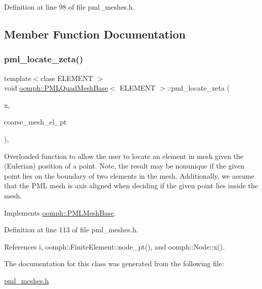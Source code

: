 Definition at line 98 of file pml\+\_\+meshes.\+h.



\subsection{Member Function Documentation}
\mbox{\label{classoomph_1_1PMLQuadMeshBase_a8054b13b65a898e1364ca30eace6c1e8}} 
\subsubsection{\texorpdfstring{pml\+\_\+locate\+\_\+zeta()}{pml\_locate\_zeta()}}
{\footnotesize\ttfamily template$<$class E\+L\+E\+M\+E\+NT $>$ \\
void \hyperlink{classoomph_1_1PMLQuadMeshBase}{oomph\+::\+P\+M\+L\+Quad\+Mesh\+Base}$<$ E\+L\+E\+M\+E\+NT $>$\+::pml\+\_\+locate\+\_\+zeta (\begin{DoxyParamCaption}\item[{const \hyperlink{classoomph_1_1Vector}{Vector}$<$ double $>$ \&}]{x,  }\item[{\hyperlink{classoomph_1_1FiniteElement}{Finite\+Element} $\ast$\&}]{coarse\+\_\+mesh\+\_\+el\+\_\+pt }\end{DoxyParamCaption})\hspace{0.3cm}{\ttfamily [inline]}, {\ttfamily [virtual]}}



Overloaded function to allow the user to locate an element in mesh given the (Eulerian) position of a point. Note, the result may be nonunique if the given point lies on the boundary of two elements in the mesh. Additionally, we assume that the P\+ML mesh is axis aligned when deciding if the given point lies inside the mesh. 



Implements \hyperlink{classoomph_1_1PMLMeshBase_a49d7e044f51a32bed758d4c16052b995}{oomph\+::\+P\+M\+L\+Mesh\+Base}.



Definition at line 113 of file pml\+\_\+meshes.\+h.



References i, oomph\+::\+Finite\+Element\+::node\+\_\+pt(), and oomph\+::\+Node\+::x().



The documentation for this class was generated from the following file\+:\begin{DoxyCompactItemize}
\item 
\hyperlink{pml__meshes_8h}{pml\+\_\+meshes.\+h}\end{DoxyCompactItemize}
